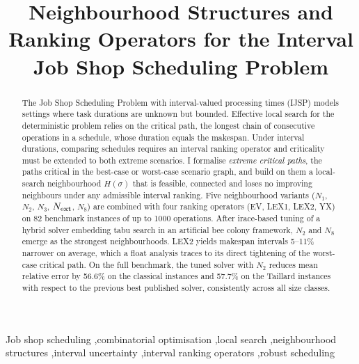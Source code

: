\documentclass[preprint,12pt]{elsarticle}
\begin{document}
\begin{frontmatter}


\title{Neighbourhood Structures and Ranking Operators for the Interval Job Shop Scheduling Problem}

\author{}

\begin{abstract}
The Job Shop Scheduling Problem with interval-valued processing times (IJSP) models settings where task durations are unknown but bounded. Effective local search for the deterministic problem relies on the critical path, the longest chain of consecutive operations in a schedule, whose duration equals the makespan. Under interval durations, comparing schedules requires an interval ranking operator and criticality must be extended to both extreme scenarios. I formalise \emph{extreme critical paths}, the paths critical in the best-case or worst-case scenario graph, and build on them a local-search neighbourhood $H(\sigma)$ that is feasible, connected and loses no improving neighbours under any admissible interval ranking. Five neighbourhood variants ($N_1$, $N_2$, $N_3$, $N_{\rm ext}$, $N_8$) are combined with four ranking operators (EV, LEX1, LEX2, YX) on 82 benchmark instances of up to 1000 operations. After irace-based tuning of a hybrid solver embedding tabu search in an artificial bee colony framework, $N_2$ and $N_8$ emerge as the strongest neighbourhoods. LEX2 yields makespan intervals 5--11\% narrower on average, which a float analysis traces to its direct tightening of the worst-case critical path. On the full benchmark, the tuned solver with $N_2$ reduces mean relative error by 56.6\% on the classical instances and 57.7\% on the Taillard instances with respect to the previous best published solver, consistently across all size classes.
\end{abstract}


\begin{keyword}
Job shop scheduling \sep combinatorial optimisation \sep local search \sep neighbourhood structures \sep interval uncertainty \sep interval ranking operators \sep robust scheduling
\end{keyword}

\end{frontmatter}

\end{document}
